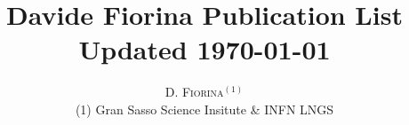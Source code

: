 \documentclass[a4paper,11pt,openright]{article}
\title{Davide Fiorina Publication List\\ Updated \today} %
\author{%
	\textsc{D. Fiorina$^{(1)}$} \\[1ex] %
	\normalsize (1) Gran Sasso Science Insitute \& INFN LNGS \\
}
\date{} %
\begin{document}
	\maketitle



\nocite{*}
\printbibliography
\end{document}
